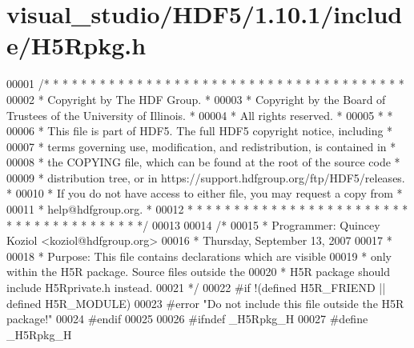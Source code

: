 \hypertarget{visual__studio_2_h_d_f5_21_810_81_2include_2_h5_rpkg_8h_source}{}\section{visual\+\_\+studio/\+H\+D\+F5/1.10.1/include/\+H5\+Rpkg.h}
\label{visual__studio_2_h_d_f5_21_810_81_2include_2_h5_rpkg_8h_source}

\begin{DoxyCode}
00001 \textcolor{comment}{/* * * * * * * * * * * * * * * * * * * * * * * * * * * * * * * * * * * * * * *}
00002 \textcolor{comment}{ * Copyright by The HDF Group.                                               *}
00003 \textcolor{comment}{ * Copyright by the Board of Trustees of the University of Illinois.         *}
00004 \textcolor{comment}{ * All rights reserved.                                                      *}
00005 \textcolor{comment}{ *                                                                           *}
00006 \textcolor{comment}{ * This file is part of HDF5.  The full HDF5 copyright notice, including     *}
00007 \textcolor{comment}{ * terms governing use, modification, and redistribution, is contained in    *}
00008 \textcolor{comment}{ * the COPYING file, which can be found at the root of the source code       *}
00009 \textcolor{comment}{ * distribution tree, or in https://support.hdfgroup.org/ftp/HDF5/releases.  *}
00010 \textcolor{comment}{ * If you do not have access to either file, you may request a copy from     *}
00011 \textcolor{comment}{ * help@hdfgroup.org.                                                        *}
00012 \textcolor{comment}{ * * * * * * * * * * * * * * * * * * * * * * * * * * * * * * * * * * * * * * */}
00013 
00014 \textcolor{comment}{/*}
00015 \textcolor{comment}{ * Programmer: Quincey Koziol <koziol@hdfgroup.org>}
00016 \textcolor{comment}{ *             Thursday, September 13, 2007}
00017 \textcolor{comment}{ *}
00018 \textcolor{comment}{ * Purpose:     This file contains declarations which are visible}
00019 \textcolor{comment}{ *              only within the H5R package. Source files outside the}
00020 \textcolor{comment}{ *              H5R package should include H5Rprivate.h instead.}
00021 \textcolor{comment}{ */}
00022 \textcolor{preprocessor}{#if !(defined H5R\_FRIEND || defined H5R\_MODULE)}
00023 \textcolor{preprocessor}{#error "Do not include this file outside the H5R package!"}
00024 \textcolor{preprocessor}{#endif}
00025 
00026 \textcolor{preprocessor}{#ifndef \_H5Rpkg\_H}
00027 \textcolor{preprocessor}{#define \_H5Rpkg\_H}

\end{DoxyCode}
